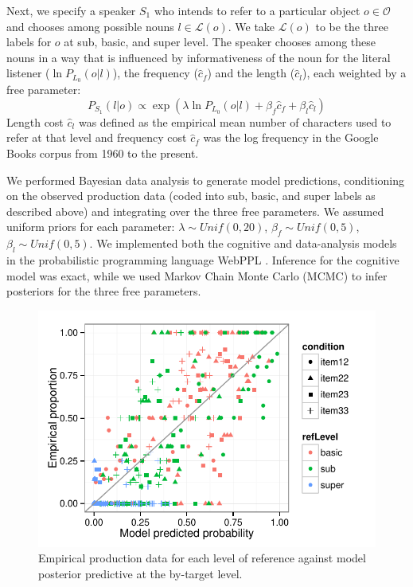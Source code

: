 \documentclass[10pt,letterpaper]{article}
\begin{document}
Next, we specify a speaker $S_1$ who intends to refer to a particular object $o \in \mathcal{O}$ and chooses among possible nouns $l \in {\mathcal L}(o)$.
We take ${\mathcal L}(o)$ to be the three labels for $o$ at sub, basic, and super level.
The speaker chooses among these nouns in a way that is influenced by informativeness of the noun for the literal listener ($\ln P_{L_0}(o | l)$), the frequency ($\hat{c}_f$) and the length  ($\hat{c}_l$), each weighted by a free parameter:
$$P_{S_1}(l | o) \propto \exp(\lambda \ln P_{L_0}(o | l) + \beta_f \hat{c}_f  + \beta_l \hat{c}_l)$$
Length cost $\hat{c}_l$ was defined as the empirical mean number of characters used to refer at that level and frequency cost $\hat{c}_f$ was the log frequency in the Google Books corpus from 1960 to the present. 

We performed Bayesian data analysis to generate model predictions, conditioning on the observed production data (coded into sub, basic, and super labels as described above) and integrating over the three free parameters.
We assumed uniform priors for each parameter: $\lambda  \sim Unif(0,20)$, $\beta_f \sim Unif(0,5)$, $\beta_l \sim Unif(0,5)$.
We implemented both the cognitive and data-analysis models in the probabilistic programming language WebPPL \cite{GoodmanStuhlmuller14_DIPPL}.
Inference for the cognitive model was exact, while we used Markov Chain Monte Carlo (MCMC) to infer posteriors for the three free parameters.

\begin{figure}[t!]
\centering
\includegraphics[width=.45\textwidth]{graphs/scatterplot}
\caption{Empirical production data for each level of reference against model posterior predictive at the by-target level.}
 \label{fig:scatterplot}
\end{figure}
\end{document}
